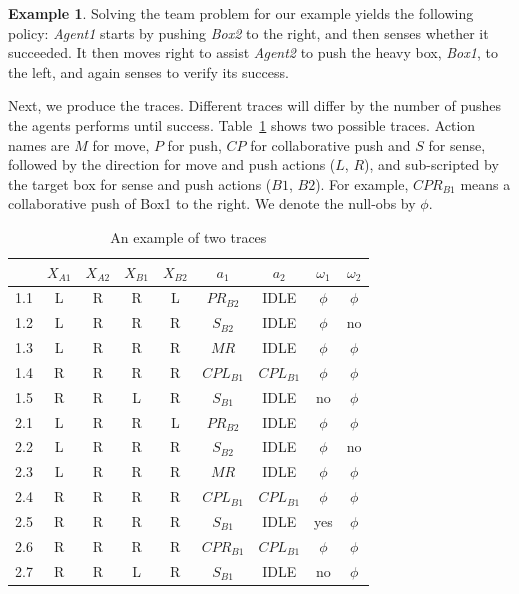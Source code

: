 \documentclass[letterpaper]{article}
\theoremstyle{definition}
\newtheorem{example}{Example}
\begin{document}
\begin{example}
Solving the team problem for our example yields the following policy:
 \emph{Agent1} starts by pushing \emph{Box2} to the right, and then senses whether it succeeded. It then moves right to assist \emph{Agent2} to push the heavy box, \emph{Box1}, to the left, and again senses to verify its success.

Next, we produce the traces. Different
traces will differ by the number of pushes the agents performs until success.
Table~\ref{tbl:Traces} shows two possible traces.
Action names are $M$ for move, $P$ for push, $CP$ for collaborative push and $S$ for sense,
followed by the direction for move and push actions ($L$, $R$), and sub-scripted by the target box for sense and push actions ($B1$, $B2$). For example, $CPR_{B1}$ means a collaborative push of Box1 to the right.
We denote the null-obs by $\phi$.


\begin{table}[ht]
    \centering
    \scriptsize
    \begin{tabular}{|c||c|c|c|c||c|c||c|c|}
    \hline
     &$X_{A1}$&$X_{A2}$&$X_{B1}$&$X_{B2}$&$a_1$&$a_2$&$\omega_1$&$\omega_2$\\ \hline
    1.1 &L&R&R&L&$PR_{B2}$&IDLE&$\phi$& $\phi$\\
    1.2 &L&R&R&R&$S_{B2}$&IDLE&$\phi$& no\\
    1.3 &L&R&R&R&$MR$&IDLE&$\phi$&$\phi$\\
    1.4 &R&R&R&R&$CPL_{B1}$&$CPL_{B1}$&$\phi$&$\phi$\\
    1.5 &R&R&L&R&$S_{B1}$&IDLE&no&$\phi$\\ \hline
    \hline\hline
    2.1 &L&R&R&L&$PR_{B2}$&IDLE&$\phi$& $\phi$\\
    2.2 &L&R&R&R&$S_{B2}$&IDLE&$\phi$& no\\
    2.3 &L&R&R&R&$MR$&IDLE&$\phi$&$\phi$\\
    2.4 &R&R&R&R&$CPL_{B1}$&$CPL_{B1}$&$\phi$&$\phi$\\
    2.5 &R&R&R&R&$S_{B1}$&IDLE&yes&$\phi$\\
    2.6 &R&R&R&R&$CPR_{B1}$&$CPL_{B1}$&$\phi$&$\phi$\\
    2.7 &R&R&L&R&$S_{B1}$& IDLE&no&$\phi$\\ \hline
    \end{tabular}
    \caption{\label{tbl:Traces}An example of two traces}
\end{table}
\end{example}
\end{document}
